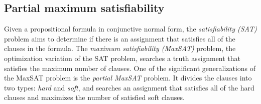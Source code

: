 \documentclass[review]{elsarticle}
\newcommand{\inc}[1][]{\mathtt{Inc}(#1)}
\newcommand{\dec}[1][]{\mathtt{Dec}(#1)}
\newcommand{\jumpZero}[1][]{\mathtt{JZ}(#1)}
\begin{document}
%	
%	
	

	\subsection{Partial maximum satisfiability}
	Given a propositional formula in conjunctive normal form, the \textit{satisfiability (SAT)} problem aims to determine if there is an assignment that satisfies all of the clauses in the formula.
	The \textit{maximum satisfiability (MaxSAT)} problem, the optimization variation of the SAT problem, searches a truth assignment that satisfies the maximum number of clauses.
	One of the significant generalizations of the MaxSAT problem is the \textit{partial MaxSAT} problem.
	It divides the clauses into two types: \textit{hard} and \textit{soft}, and searches an assignment that satisfies all of the hard clauses and maximizes the number of satisfied soft clauses.
\end{document}
